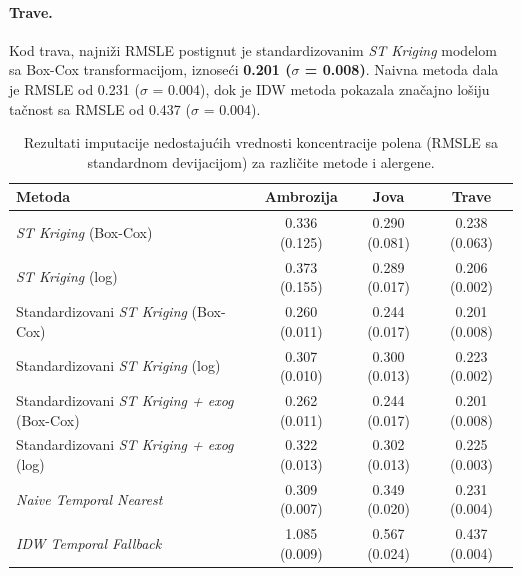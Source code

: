 \documentclass[12pt]{article}
\begin{document}
\paragraph{Trave.}
Kod trava, najniži RMSLE postignut je standardizovanim \textit{ST Kriging} modelom sa Box-Cox transformacijom, iznoseći \textbf{0.201 ($\sigma$ = 0.008)}. Naivna metoda dala je RMSLE od 0.231 ($\sigma$ = 0.004), dok je IDW metoda pokazala značajno lošiju tačnost sa RMSLE od 0.437 ($\sigma$ = 0.004).



\begin{table}[H]
\centering
\caption{Rezultati imputacije nedostajućih vrednosti koncentracije polena (RMSLE sa standardnom devijacijom) za različite metode i alergene.}

\label{tab:imputation_all_methods_std}
\renewcommand{\arraystretch}{1.3}
\begin{tabular}{|l|c|c|c|}
\hline
\textbf{Metoda} & \textbf{Ambrozija} & \textbf{Jova} & \textbf{Trave} \\
\hline
\textit{ST Kriging} (Box-Cox) & 0.336 (0.125) & 0.290 (0.081) & 0.238 (0.063) \\
\hline
\textit{ST Kriging} (log) & 0.373 (0.155) & 0.289 (0.017) & 0.206 (0.002) \\
\hline
Standardizovani \textit{ST Kriging} (Box-Cox) & 0.260 (0.011) & 0.244 (0.017) & 0.201 (0.008) \\
\hline
Standardizovani \textit{ST Kriging} (log) & 0.307 (0.010) & 0.300 (0.013) & 0.223 (0.002) \\
\hline
Standardizovani \textit{ST Kriging + exog} (Box-Cox) & 0.262 (0.011) & 0.244 (0.017) & 0.201 (0.008) \\
\hline
Standardizovani \textit{ST Kriging + exog} (log) & 0.322 (0.013) & 0.302 (0.013) & 0.225 (0.003) \\
\hline
\textit{Naive Temporal Nearest} & 0.309 (0.007) & 0.349 (0.020) & 0.231 (0.004) \\
\hline
\textit{IDW Temporal Fallback} & 1.085 (0.009) & 0.567 (0.024) & 0.437 (0.004) \\
\hline
\end{tabular}
\end{table}
\end{document}
